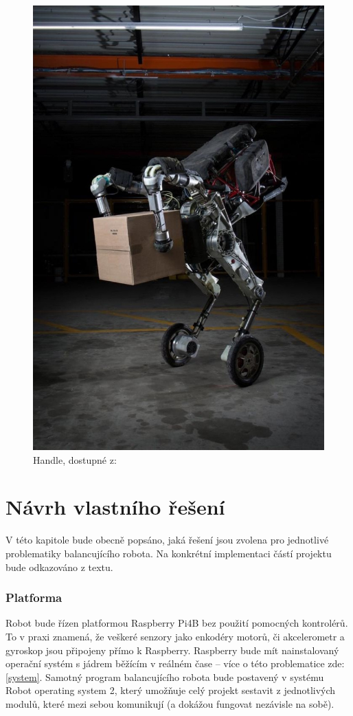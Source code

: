 \begin{figure}[H]
    \centering
    \includegraphics[width=0.6\linewidth]{obrazky-figures/handle.jpg}
    \caption{Handle, dostupné z: \cite{handle}}
    \label{handle}
\end{figure}

\chapter{Návrh vlastního řešení}
\label{chap3}
V této kapitole bude obecně popsáno, jaká řešení jsou zvolena pro jednotlivé problematiky balancujícího robota. Na konkrétní implementaci částí projektu bude odkazováno z textu.

\subsection*{Platforma}
Robot bude řízen platformou Raspberry Pi4B bez použití pomocných kontrolérů. To v praxi znamená, že veškeré senzory jako enkodéry motorů, či akcelerometr a gyroskop jsou připojeny přímo k Raspberry. Raspberry bude mít nainstalovaný operační systém s jádrem běžícím v reálném čase -- více o této problematice zde: \ref{system}. Samotný program balancujícího robota bude postavený v systému Robot operating system 2, který umožňuje celý projekt sestavit z jednotlivých modulů, které mezi sebou komunikují (a dokážou fungovat nezávisle na sobě).

